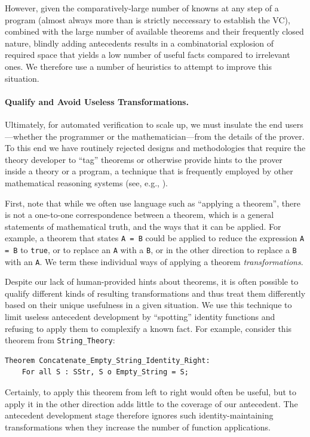 However, given the comparatively-large number of knowns at any step of a program (almost always more than is strictly neccessary to establish the VC), combined with the large number of available theorems and their frequently closed nature, blindly adding antecedents results in a combinatorial explosion of required space that yields a low number of useful facts compared to irrelevant ones.  We therefore use a number of heuristics to attempt to improve this situation.

\paragraph{Qualify and Avoid Useless Transformations.}  Ultimately, for automated verification to scale up, we must insulate the end users---whether the programmer or the mathematician---from the details of the prover.  To this end we have routinely rejected designs and methodologies that require the theory developer to ``tag'' theorems or otherwise provide hints to the prover inside a theory or a program, a technique that is frequently employed by other mathematical reasoning systems (see, e.g., \cite{kaufmannACL2}).

First, note that while we often use language such as ``applying a theorem'', there is not a one-to-one correspondence between a theorem, which is a general statements of mathematical truth, and the ways that it can be applied.  For example, a theorem that states \texttt{A = B} could be applied to reduce the expression \texttt{A = B} to \texttt{true}, or to replace an \texttt{A} with a \texttt{B}, or in the other direction to replace a \texttt{B} with an \texttt{A}.  We term these individual ways of applying a theorem \emph{transformations}.

Despite our lack of human-provided hints about theorems, it is often possible to qualify different kinds of resulting transformations and thus treat them differently based on their unique usefulness in a given situation.  We use this technique to limit useless antecedent development by ``spotting'' identity functions and refusing to apply them to complexify a known fact.  For example, consider this theorem from \texttt{String\_Theory}:

\begin{lstlisting}
Theorem Concatenate_Empty_String_Identity_Right:
	For all S : SStr, S o Empty_String = S;
\end{lstlisting}

Certainly, to apply this theorem from left to right would often be useful, but to apply it in the other direction adds little to the coverage of our antecedent.  The antecedent development stage therefore ignores such identity-maintaining transformations when they increase the number of function applications.

